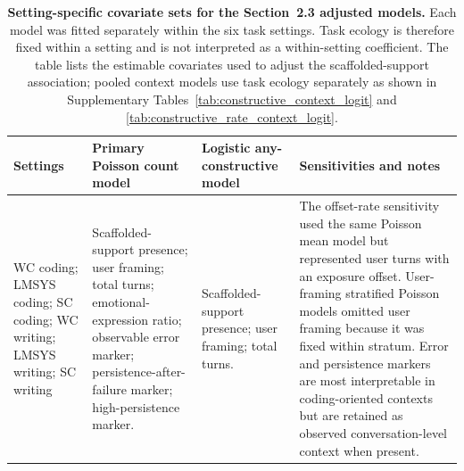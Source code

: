 \begin{table}[p]
\scriptsize
\centering
\caption{\textbf{Setting-specific covariate sets for the Section~2.3 adjusted models.} Each model was fitted separately within the six task settings. Task ecology is therefore fixed within a setting and is not interpreted as a within-setting coefficient. The table lists the estimable covariates used to adjust the scaffolded-support association; pooled context models use task ecology separately as shown in Supplementary Tables~\ref{tab:constructive_context_logit} and \ref{tab:constructive_rate_context_logit}.}
\label{tab:setting_model_covariates}
\setlength{\tabcolsep}{3pt}
\renewcommand{\arraystretch}{1.12}
\begin{tabularx}{\textwidth}{>{\raggedright\arraybackslash}p{}>{\raggedright\arraybackslash}p{}>{\raggedright\arraybackslash}p{}>{\raggedright\arraybackslash}X}
\toprule
Settings & Primary Poisson count model & Logistic any-constructive model & Sensitivities and notes \\
\midrule
WC coding; LMSYS coding; SC coding; WC writing; LMSYS writing; SC writing
& Scaffolded-support presence; user framing; total turns; emotional-expression ratio; observable error marker; persistence-after-failure marker; high-persistence marker.
& Scaffolded-support presence; user framing; total turns.
& The offset-rate sensitivity used the same Poisson mean model but represented user turns with an exposure offset. User-framing stratified Poisson models omitted user framing because it was fixed within stratum. Error and persistence markers are most interpretable in coding-oriented contexts but are retained as observed conversation-level context when present. \\
\bottomrule
\end{tabularx}
\end{table}
